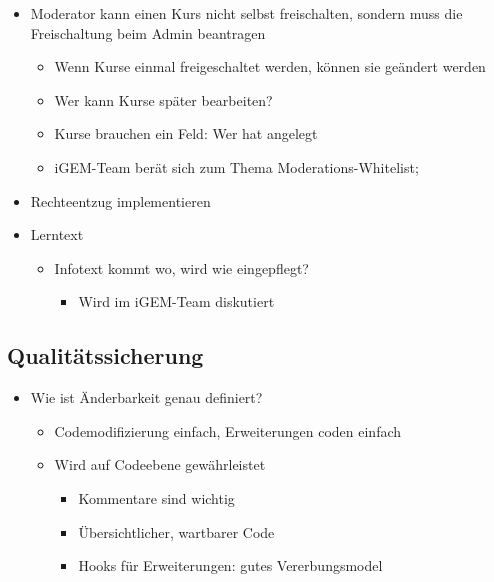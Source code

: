 \documentclass[colorback, accentcolor=tud1c, paper=a4]{tudexercise}
\begin{document}
\begin{multicols}{2}
\begin{itemize}
\begin{itemize}
	\end{itemize}
	\item Moderator kann einen Kurs nicht selbst freischalten, sondern muss die Freischaltung beim Admin beantragen
	\begin{itemize}
		\item Wenn Kurse einmal freigeschaltet werden,  können sie geändert werden
		\item Wer kann Kurse später bearbeiten?
		\item Kurse brauchen ein Feld: Wer hat angelegt
		\item iGEM-Team berät sich zum Thema Moderations-Whitelist;
	\end{itemize}
	\item Rechteentzug implementieren
	\item Lerntext
	\begin{itemize}
		\item Infotext kommt wo, wird wie eingepflegt?
		\begin{itemize}
			\item Wird im iGEM-Team diskutiert
		\end{itemize}
	\end{itemize}
\end{itemize}

\subsection*{Qualitätssicherung}
\begin{itemize}
	\item Wie ist Änderbarkeit genau definiert?
	\begin{itemize}
		\item Codemodifizierung einfach, Erweiterungen coden einfach
		\item Wird auf Codeebene gewährleistet
		\begin{itemize}
			\item Kommentare sind wichtig
			\item Übersichtlicher, wartbarer Code
			\item Hooks für Erweiterungen: gutes Vererbungsmodel
		\end{itemize}
	\end{itemize}
\end{itemize}
		

\end{multicols}
\end{document}
